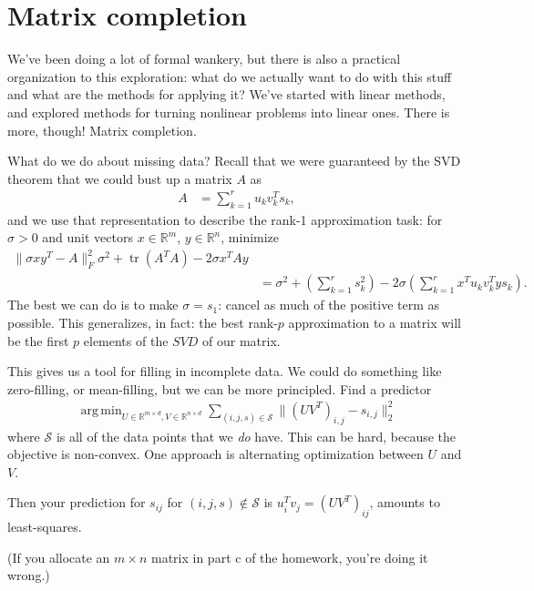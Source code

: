 \documentclass[11pt,letterpaper]{article}
\DeclareMathOperator*{\argmin}{arg\,min}
\DeclareMathOperator{\tr}{tr}
\newcommand{\R}{\mathbb{R}}
\theoremstyle{definition}
\theoremstyle{plain}
\numberwithin{equation}{section}
\numberwithin{figure}{section}
\begin{document}
\section{Matrix completion}
We've been doing a lot of formal wankery, but there is also a practical organization to this exploration: what do we actually want to do with this stuff and what are the methods for applying it? We've started with linear methods, and explored methods for turning nonlinear problems into linear ones. There is more, though! Matrix completion.

What do we do about missing data? Recall that we were guaranteed by the SVD theorem that we could bust up a matrix $A$ as
%
\begin{align}
	A &= \sum_{k=1}^r u_k v_k^T s_k,
\end{align}
%
and we use that representation to describe the rank-1 approximation task: for $\sigma>0$ and unit vectors $x \in \R^m$, $y \in \R^n$, minimize
%
\begin{align}
	\|\sigma xy^T  - A\|_F^2 \sigma^2 + \tr(A^T A) - 2 \sigma x^T A y\\
	&= \sigma^2 + \left(\sum_{k=1}^r s_k^2\right) - 2 \sigma\left(\sum_{k=1}^r x^T u_k v_k^T y s_k\right).
\end{align}
%
The best we can do is to make $\sigma = s_1$: cancel as much of the positive term as possible. This generalizes, in fact: the best rank-$p$ approximation to a matrix will be the first $p$ elements of the $SVD$ of our matrix.



This gives us a tool for filling in incomplete data. We could do something like zero-filling, or mean-filling, but we can be more principled. Find a predictor
%
\begin{align}
	\argmin_{U\in\R^{m\times d}, V\in\R^{n\times d}} \sum_{(i,j,s)\in\mathcal{S}} \|(UV^T)_{i,j} - s_{i,j}\|_2^2
\end{align}
%
where $\mathcal{S}$ is all of the data points that we \emph{do} have. This can be hard, because the objective is non-convex. One approach is alternating optimization between $U$ and $V$.

Then your prediction for $s_{ij}$ for $(i,j,s) \notin \mathcal{S}$ is $u_i^T v_j = (UV^T)_{ij}$, amounts to least-squares.

(If you allocate an $m \times n$ matrix in part c of the homework, you're doing it wrong.)
\end{document}
